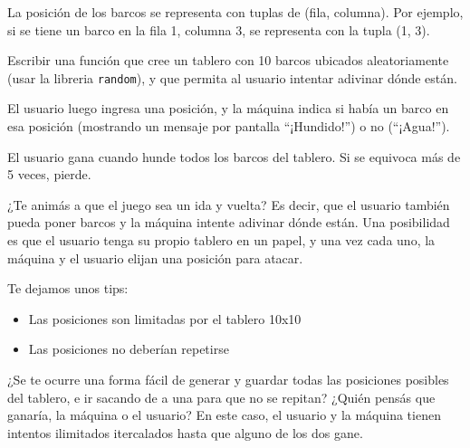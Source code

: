\documentclass[
  letterpaper,
  DIV=11,
  numbers=noendperiod]{scrreprt}
\providecommand{\tightlist}{%
  \setlength{\itemsep}{0pt}\setlength{\parskip}{0pt}}\usepackage{longtable,booktabs,array}
\begin{document}
La posición de los barcos se representa con tuplas de (fila, columna).
Por ejemplo, si se tiene un barco en la fila 1, columna 3, se representa
con la tupla (1, 3).

Escribir una función que cree un tablero con 10 barcos ubicados
aleatoriamente (usar la libreria \texttt{random}), y que permita al
usuario intentar adivinar dónde están.

El usuario luego ingresa una posición, y la máquina indica si había un
barco en esa posición (mostrando un mensaje por pantalla ``¡Hundido!'')
o no (``¡Agua!'').

El usuario gana cuando hunde todos los barcos del tablero. Si se
equivoca más de 5 veces, pierde.

\begin{tcolorbox}[enhanced jigsaw, colframe=quarto-callout-important-color-frame, opacityback=0, opacitybacktitle=0.6, bottomrule=.15mm, toprule=.15mm, coltitle=black, breakable, colback=white, leftrule=.75mm, titlerule=0mm, bottomtitle=1mm, toptitle=1mm, rightrule=.15mm, title=\textcolor{quarto-callout-important-color}{\faExclamation}\hspace{0.5em}{Batalla Naval: Modo Supervivencia}, arc=.35mm, left=2mm, colbacktitle=quarto-callout-important-color!10!white]

¿Te animás a que el juego sea un ida y vuelta? Es decir, que el usuario
también pueda poner barcos y la máquina intente adivinar dónde están.
Una posibilidad es que el usuario tenga su propio tablero en un papel, y
una vez cada uno, la máquina y el usuario elijan una posición para
atacar.

Te dejamos unos tips:

\begin{itemize}
\tightlist
\item
  Las posiciones son limitadas por el tablero 10x10
\item
  Las posiciones no deberían repetirse
\end{itemize}

¿Se te ocurre una forma fácil de generar y guardar todas las posiciones
posibles del tablero, e ir sacando de a una para que no se repitan?
¿Quién pensás que ganaría, la máquina o el usuario? En este caso, el
usuario y la máquina tienen intentos ilimitados itercalados hasta que
alguno de los dos gane.

\end{tcolorbox}
\end{document}
